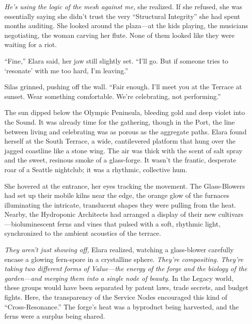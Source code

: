 \textit{He's using the logic of the mesh against me,} she realized. If she refused, she was essentially saying she didn't trust the very ``Structural Integrity'' she had spent months auditing. She looked around the plaza—at the kids playing, the musicians negotiating, the woman carving her flute. None of them looked like they were waiting for a riot.

``Fine,'' Elara said, her jaw still slightly set. ``I'll go. But if someone tries to `resonate' with me too hard, I'm leaving.''

Silas grinned, pushing off the wall. ``Fair enough. I'll meet you at the Terrace at sunset. Wear something comfortable. We're celebrating, not performing.''


The sun dipped below the Olympic Peninsula, bleeding gold and deep violet into the Sound. It was already time for the gathering, though in the Port, the line between living and celebrating was as porous as the aggregate paths. Elara found herself at the South Terrace, a wide, cantilevered platform that hung over the jagged coastline like a stone wing. The air was thick with the scent of salt spray and the sweet, resinous smoke of a glass-forge. It wasn't the frantic, desperate roar of a Seattle nightclub; it was a rhythmic, collective hum. 

She hovered at the entrance, her eyes tracking the movement. The Glass-Blowers had set up their mobile kilns near the edge, the orange glow of the furnaces illuminating the intricate, translucent shapes they were pulling from the heat. Nearby, the Hydroponic Architects had arranged a display of their new cultivars—bioluminescent ferns and vines that pulsed with a soft, rhythmic light, synchronized to the ambient acoustics of the terrace. 

\textit{They aren't just showing off,} Elara realized, watching a glass-blower carefully encase a glowing fern-spore in a crystalline sphere. \textit{They're compositing. They're taking two different forms of Value—the energy of the forge and the biology of the garden—and merging them into a single node of beauty.} In the Legacy world, these groups would have been separated by patent laws, trade secrets, and budget fights. Here, the transparency of the Service Nodes encouraged this kind of ``Cross-Resonance.'' The forge's heat was a byproduct being harvested, and the ferns were a surplus being shared. 


